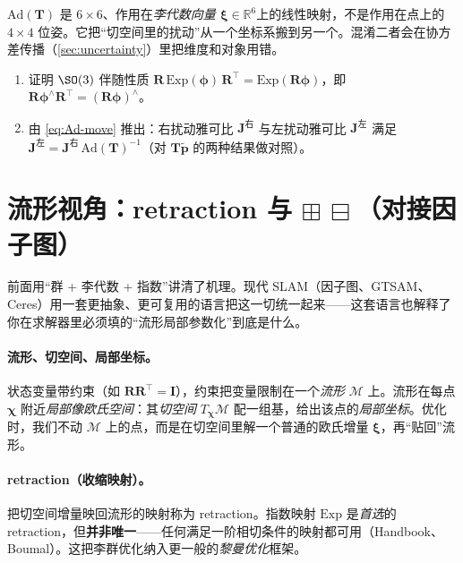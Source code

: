 \begin{pitfall}
$\mathrm{Ad}(\mathbf{T})$ 是 $6\times6$、作用在\emph{李代数向量 $\boldsymbol{\xi}\in\mathbb{R}^6$}上的线性映射，不是作用在点上的 $4\times4$ 位姿。它把“切空间里的扰动”从一个坐标系搬到另一个。混淆二者会在协方差传播（\cref{sec:uncertainty}）里把维度和对象用错。
\end{pitfall}

\begin{practice}
\begin{enumerate}
  \item 证明 $\SO(3)$ 伴随性质 $\mathbf{R}\,\mathrm{Exp}(\boldsymbol{\phi})\,\mathbf{R}^\top=\mathrm{Exp}(\mathbf{R}\boldsymbol{\phi})$，即 $\mathbf{R}\boldsymbol{\phi}^\wedge\mathbf{R}^\top=(\mathbf{R}\boldsymbol{\phi})^\wedge$。
  \item 由 \cref{eq:Ad-move} 推出：右扰动雅可比 $\mathbf{J}^{\text{右}}$ 与左扰动雅可比 $\mathbf{J}^{\text{左}}$ 满足 $\mathbf{J}^{\text{左}}=\mathbf{J}^{\text{右}}\,\mathrm{Ad}(\mathbf{T})^{-1}$（对 $\mathbf{T}\tilde{\mathbf{p}}$ 的两种结果做对照）。
\end{enumerate}
\end{practice}

\section{流形视角：retraction 与 \texorpdfstring{$\boxplus\,\boxminus$}{boxplus/boxminus}（对接因子图）}
\label{sec:manifold}

前面用“群 + 李代数 + 指数”讲清了机理。现代 SLAM（因子图、GTSAM、Ceres）用一套更抽象、更可复用的语言把这一切统一起来——这套语言也解释了你在求解器里必须填的“流形局部参数化”到底是什么\cite{carlone2026handbook,hertzberg2013integrating}。

\paragraph{流形、切空间、局部坐标。}状态变量带约束（如 $\mathbf{R}\mathbf{R}^\top=\mathbf{I}$），约束把变量限制在一个\emph{流形} $\mathcal{M}$ 上。流形在每点 $\boldsymbol{\chi}$ 附近\emph{局部像欧氏空间}：其\emph{切空间} $T_{\boldsymbol{\chi}}\mathcal{M}$ 配一组基，给出该点的\emph{局部坐标}。优化时，我们不动 $\mathcal{M}$ 上的点，而是在切空间里解一个普通的欧氏增量 $\boldsymbol{\xi}$，再“贴回”流形。

\paragraph{retraction（收缩映射）。}把切空间增量映回流形的映射称为 retraction。指数映射 $\mathrm{Exp}$ 是\emph{首选}的 retraction，但\textbf{并非唯一}——任何满足一阶相切条件的映射都可用（Handbook、Boumal）。这把李群优化纳入更一般的\emph{黎曼优化}框架。

